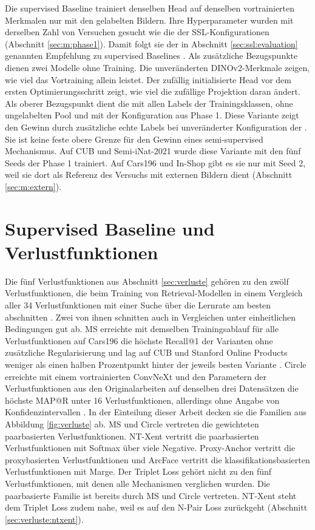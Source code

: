 Die supervised Baseline \UEBL trainiert denselben Head auf denselben vortrainierten Merkmalen nur mit den gelabelten Bildern. Ihre Hyperparameter wurden mit derselben Zahl von Versuchen gesucht wie die der \ac{SSL}-Konfigurationen (Abschnitt \ref{sec:m:phase1}). Damit folgt sie der in Abschnitt \ref{sec:ssl:evaluation} genannten Empfehlung zu supervised Baselines \cite{oliver_realistic_2018}. Als zusätzliche Bezugspunkte dienen zwei Modelle ohne Training. Die unveränderten DINOv2-Merkmale zeigen, wie viel das Vortraining allein leistet. Der zufällig initialisierte Head vor dem ersten Optimierungsschritt zeigt, wie viel die zufällige Projektion daran ändert. Als oberer Bezugspunkt dient die \UEBL mit allen Labels der Trainingsklassen, ohne ungelabelten Pool und mit der Konfiguration aus Phase 1. Diese Variante zeigt den Gewinn durch zusätzliche echte Labels bei unveränderter Konfiguration der \UEBL. Sie ist keine feste obere Grenze für den Gewinn eines semi-supervised Mechanismus. Auf \ac{CUB} und Semi-iNat-2021 wurde diese Variante mit den fünf Seeds der Phase 1 trainiert. Auf Cars196 und In-Shop gibt es sie nur mit Seed 2, weil sie dort als Referenz des Versuchs mit externen Bildern dient (Abschnitt \ref{sec:m:extern}).

\section{Supervised Baseline und Verlustfunktionen}
\label{sec:m:verluste}
Die fünf Verlustfunktionen aus Abschnitt \ref{sec:verluste} gehören zu den zwölf Verlustfunktionen, die beim Training von Retrieval-Modellen in einem Vergleich aller 34 Verlustfunktionen mit einer Suche über die Lernrate am besten abschnitten \cite{berton_all_2025}. Zwei von ihnen schnitten auch in Vergleichen unter einheitlichen Bedingungen gut ab. \ac{MS} erreichte mit demselben Trainingsablauf für alle Verlustfunktionen auf Cars196 die höchste Recall@1 der Varianten ohne zusätzliche Regularisierung und lag auf \ac{CUB} und Stanford Online Products weniger als einen halben Prozentpunkt hinter der jeweils besten Variante \cite{roth_revisiting_2020}. Circle erreichte mit einem vortrainierten ConvNeXt und den Parametern der Verlustfunktionen aus den Originalarbeiten auf denselben drei Datensätzen die höchste \ac{MAP@R} unter 16 Verlustfunktionen, allerdings ohne Angabe von Konfidenzintervallen \cite{vasilev_deep_2023}. In der Einteilung dieser Arbeit decken sie die Familien aus Abbildung \ref{fig:verluste} ab. \ac{MS} und Circle vertreten die gewichteten paarbasierten Verlustfunktionen. \ac{NT-Xent} vertritt die paarbasierten Verlustfunktionen mit Softmax über viele Negative. Proxy-Anchor vertritt die proxybasierten Verlustfunktionen und ArcFace vertritt die klassifikationsbasierten Verlustfunktionen mit Marge. Der Triplet Loss gehört nicht zu den fünf Verlustfunktionen, mit denen alle Mechanismen verglichen wurden. Die paarbasierte Familie ist bereits durch \ac{MS} und Circle vertreten. \ac{NT-Xent} steht dem Triplet Loss zudem nahe, weil es auf den N-Pair Loss zurückgeht (Abschnitt \ref{sec:verluste:ntxent}).

